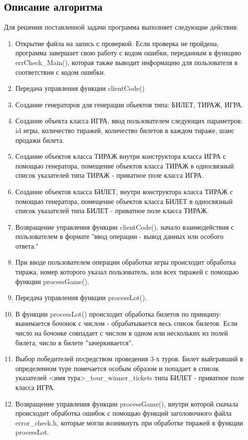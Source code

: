 \documentclass[a4paper,14pt]{article}
\begin{document}
\subsection{Описание алгоритма}
Для решения поставленной задачи программа выполняет следующие действия:
\begin{enumerate} 
  \item Открытие файла на запись с проверкой. Если проверка не пройдена, программа завершает свою работу с кодом ошибки, переданным в функцию errCheck\_Main(), которая также выводит информацию для пользователя в соответствии с кодом ошибки.
  \item Передача управления функции clientCode()
  \item Создание генераторов для генерации обьектов типа: БИЛЕТ, ТИРАЖ, ИГРА.
  \item Создание объекта класса ИГРА, ввод пользователем следующих параметров: id игры, количество тиражей, количество билетов в каждом тираже, шанс продажи билета.
  \item Создание объектов класса ТИРАЖ внутри конструктора класса ИГРА с помощью генератора, помещение объектов класса ТИРАЖ в односвязный список указателей типа ТИРАЖ - приватное поле класса ИГРА. 
  \item Создание объектов класса БИЛЕТ, внутри конструктора класса ТИРАЖ с помощью генератора, помещение объектов класса БИЛЕТ в односвязный список указателей типа БИЛЕТ - приватное поле класса ТИРАЖ. 
  \item Возвращение управления функции clientCode(), начало взаимодействия с пользователем в формате "ввод операции - вывод данных или особого ответа."
  \item При вводе пользователем операции обработки игры происходит обработка тиража, номер которого указал пользователь, или всех тиражей с помощью функции processGame().
  \item Передача управления функции processLot().
  \item В функции processLot() происходит \textquotedbl{} обработка билетов по принципу: вынимается бочонок с числом - обрабатывается весь список билетов. Если число на бочонке совпадает с числом в одном или нескольких из полей билета, число в билете "зачеркивается".
  \item Выбор победителей посредством проведения 3-х туров. Билет выйгравший в определенном туре помечается особым образом и попадает в список указателей <имя тура>\_tour\_winner\_tickets типа БИЛЕТ - приватное поле класса ИГРА.
  \item Возвращение управления функции processGame(), внутри которой сначала происходит обработка ошибок с помощью функций заголовочного файла error\_check.h, которые могли возникнуть при обработке тиражей в функции processLot.

\end{enumerate}
\end{document}
